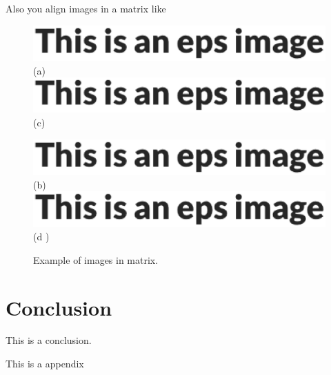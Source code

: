 \documentclass{article}
\begin{document}
    Also you align images in a matrix like %

    \begin{figure}[ht]
        \centering
        \begin{minipage}[htb]{0.48\linewidth}
            \centering
            \includegraphics[width=0.98\linewidth]{example}
            (a)
            \includegraphics[width=0.98\linewidth]{example}
            (c)
        \end{minipage}
        \begin{minipage}[htb]{0.48\linewidth}
            \centering
            \includegraphics[width=0.98\linewidth]{example}
            (b)
            \includegraphics[width=0.98\linewidth]{example}
            (d )
        \end{minipage}
        \caption{Example of images in matrix.}
        \label{fig_3}
    \end{figure}


    \section{Conclusion}
    This is a conclusion.
    
    
    \appendixpage %
    \appendix
    This is a appendix

    
    
\end{document}
